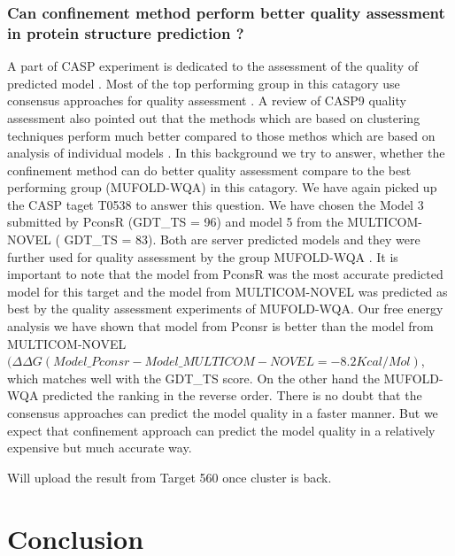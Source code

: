 \documentclass[12pt]{article}
\newcommand{\Arijit}[1]{\color{yellow}#1\normalcolor}
\begin{document}
\subsubsection{Can confinement method perform better quality assessment in protein structure prediction ?}
A part of CASP experiment is dedicated to the assessment of the quality of predicted model \cite{Kryshtafovych2011}. 
Most of the top performing group in this catagory use consensus approaches for quality assessment \cite{Wang2011}.
A review of CASP9 quality assessment also pointed out that the methods which are based on clustering
techniques perform
much better compared to those methos which are based on analysis of individual models \cite{Kryshtafovych2011}. 
In this background we try to answer, whether the confinement method can do better quality assessment compare to the best performing
group (MUFOLD-WQA) in this catagory.
We have again picked up the CASP taget T0538 to answer this question. We have chosen the Model 3 submitted by PconsR (GDT\_TS = 96) 
and model 5 from the MULTICOM-NOVEL ( GDT\_TS = 83). Both are server predicted models and they were further used for quality assessment 
by the group MUFOLD-WQA \cite{Wang2011}. It is important to note that the model from PconsR was the most accurate predicted model for this 
target and the model from MULTICOM-NOVEL was predicted as best by the quality assessment experiments of MUFOLD-WQA. 
Our free energy analysis we have shown that model from Pconsr is better than the model from 
MULTICOM-NOVEL $(\Delta \Delta G (Model\_Pconsr - Model\_MULTICOM-NOVEL = -8.2 Kcal/Mol)$, which   
matches well with the GDT\_TS score. On the other hand the MUFOLD-WQA predicted the ranking in the reverse order. 
There is no doubt that the consensus approaches can predict the model quality in a faster manner. But we expect that confinement
approach can predict the model quality in a relatively expensive but much accurate way. 

\Arijit{Will upload the result from Target 560 once cluster is back.}


\section{Conclusion}
\end{document}
